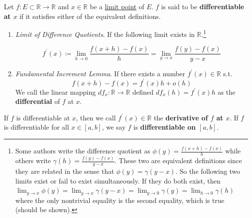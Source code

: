   \begin{definition}[Derivative]
		\label{def:derivative}
    Let $f: E \subset \mathbb{R} \to \mathbb{R}$ and $x \in \mathbb{R}$ be a \hyperref[pst-def:limit-point]{limit point} of $E$. $f$ is said to be \textbf{differentiable at $x$} if it satisfies either of the equivalent definitions. 

    \begin{enumerate}
			\item \textit{Limit of Difference Quotients}. If the following limit exists in $\mathbb{R}$.\footnote{Some authors write the difference quotient as $ \phi(y) = \frac{f(x + h) - f(x)}{h}$ while others write $\gamma(h) = \frac{f(y) - f(x)}{y - x}$. These two are equivalent definitions since they are related in the sense that $\phi(y) = \gamma(y - x)$. So the following two limits exist or fail to exist simultaneously. If they do both exist, then $\lim_{y \to x} \phi(y) = \lim_{y \to x} \gamma(y - x) = \lim_{y \to 0} \gamma(y) = \lim_{h \to 0} \gamma(h)$ where the only nontrivial equality is the second equality, which is true (should be shown). }

        \begin{equation}
          f^\prime (x) \coloneqq \lim_{h \to 0} \frac{f(x + h) - f(x)}{h} = \lim_{y \to x} \frac{f(y) - f(x)}{y - x} \label{lim_def}
        \end{equation}

      \item \textit{Fundamental Increment Lemma}. If there exists a number $f^\prime (x) \in \mathbb{R}$ s.t. 
        \begin{equation}
          f(x + h) - f(x) = f^\prime (x) h + o(h)
        \end{equation}
				We call the linear mapping $df_x: \mathbb{R} \to \mathbb{R}$ defined $df_x (h) = f^\prime (x) h$ as the \textbf{differential} of $f$ at $x$. 

    \end{enumerate}

    If $f$ is differentiable at $x$, then we call $f^\prime(x) \in \mathbb{R}$ the \textbf{derivative of $f$ at $x$}. If $f$ is differentiable for all $x \in [a, b]$, we say $f$ is \textbf{differentiable on $[a, b]$}. 

    \begin{figure}[H]
      \centering 
\end{figure}
\end{definition}
